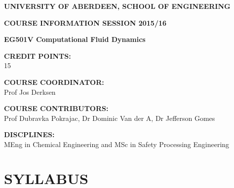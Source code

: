 \documentclass[12pts,a4paper,amsmath,amssymb,floatfix]{article}%
\begin{document}
\begin{center}
{\large {\bf UNIVERSITY OF ABERDEEN, SCHOOL OF ENGINEERING}}
\medskip

{\large {\bf COURSE INFORMATION SESSION 2015/16}}
\bigskip 

{\Large {\bf EG501V Computational Fluid Dynamics}}
\end{center}

\bigskip
\begin{flushleft}

{\large {\bf CREDIT POINTS:}}\\
\hspace{0.8cm} 15
\medskip

{\large {\bf COURSE COORDINATOR: }}\\
\hspace{0.8cm} Prof Jos Derksen
\medskip 

{\large {\bf COURSE CONTRIBUTORS:}}\\
\hspace{0.8cm} Prof Dubravka Pokrajac, Dr Dominic Van der A, Dr Jefferson Gomes
\medskip

{\large {\bf DISCPLINES:}}\\
\hspace{0.8cm} MEng in Chemical Engineering and MSc in Safety Processing Engineering
\medskip  
\end{flushleft} 

\clearpage

\section{SYLLABUS}
\end{document}
